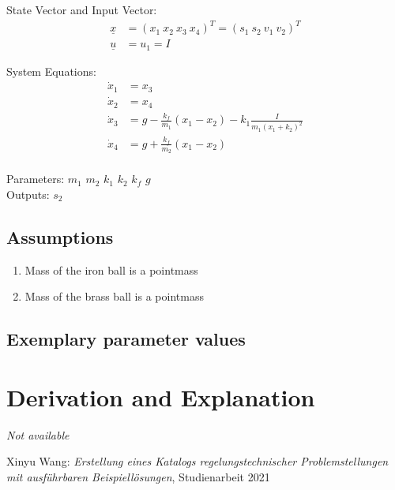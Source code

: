 \documentclass[10pt,a4paper]{article}
\begin{document}
	State Vector and Input Vector:
	\begin{align*}
		\underline{x} &= (x_1 \ x_2 \ x_3 \ x_4)^T = (s_1 \ s_2 \ v_1 \ v_2)^T \\
		\underline{u} &= u_1 = I
	\end{align*}
	
	\noindent System Equations:			
	\begin{subequations}
	\begin{align}
		\dot{x}_1 &= x_3 \\
		\dot{x}_2 &= x_4 \\
		\dot{x}_3 &= g - \frac{k_f}{m_1}(x_1 - x_2) - k_1\frac{I}{m_1(x_1+k_2)^2}  \\
		\dot{x}_4 &= g + \frac{k_f}{m_2}(x_1 - x_2) \\
	\end{align}
	\end{subequations}

	\noindent
	Parameters: $m_1$ $m_2$ $k_1$ $k_2$ $k_f$ $g$  %
	\\
	Outputs: $s_2$ %
	
	
	\subsection{Assumptions} %
		\begin{enumerate} %
			\item Mass of the iron ball is a pointmass
			\item Mass of the brass ball is a pointmass
		\end{enumerate}
	
	
	\subsection{Exemplary parameter values}
	

	
	\section{Derivation and Explanation} %
	
	\textit{Not available}
	
	
	\begin{thebibliography}{10}		
		Xinyu Wang: 
		\textit{Erstellung eines Katalogs regelungstechnischer Problemstellungen mit ausführbaren Beispiellösungen}, Studienarbeit 2021
	\end{thebibliography}
\end{document}
